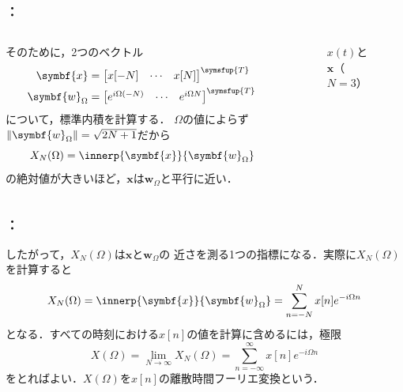 \documentclass[unicode,11pt]{beamer}
\newcommand{\figurewidth}{5cm}
\newcommand{\termdef}[1]{\alert{\sffamily #1}}
\newcommand{\trps}[1]{#1^{\symsfup{T}}}
\newcommand{\vb}[1]{\symbf{#1}}
\DeclarePairedDelimiter{\norm}{\lVert}{\rVert}
\begin{document}
\begin{frame}
  \frametitle{\secname ：\subsecname}
  \begin{columns}
    \begin{column}{0.6\textwidth}
      そのために，2つのベクトル
      \begin{align*}
        \vb{x} &= \trps{\begin{bmatrix}x[-N] & \cdots & x[N]\end{bmatrix}} \\
        \vb{w}_\Omega &= \trps{\begin{bmatrix}e^{i\Omega(-N)} & \cdots & e^{i\Omega N}\end{bmatrix}}
      \end{align*}
      について，標準内積を計算する．
      \(\Omega\)の値によらず\(\norm{\vb{w}_\Omega}=\sqrt{2N+1}\)だから
      \[
        X_N(\Omega) = \innerp{\vb{x}}{\vb{w}_\Omega}
      \]
      の絶対値が大きいほど，\(\vb{x}\)は\(\vb{w}_\Omega\)と平行に近い．
    \end{column}
    \begin{column}{0.4\textwidth}
      \begin{figure}
        \centering
        \caption{\(x(t)\)と\(\vb{x}\)（\(N=3\)）}
      \end{figure}
    \end{column}
  \end{columns}
\end{frame}

\begin{frame}
  \frametitle{\secname ：\subsecname}
  したがって，\(X_N(\Omega)\)は\(\vb{x}\)と\(\vb{w}_\Omega\)の
  近さを測る1つの指標になる．実際に\(X_N(\Omega)\)を計算すると
  \[
    X_N(\Omega) = \innerp{\vb{x}}{\vb{w}_\Omega}
    = \sum_{n=-N}^Nx[n]e^{-i\Omega n}
  \]
  となる．すべての時刻における\(x[n]\)の値を計算に含めるには，極限
  \[
    X(\Omega) = \lim_{N\to\infty}X_N(\Omega) = \sum_{n=-\infty}^\infty x[n]e^{-i\Omega n}
  \]
  をとればよい．\(X(\Omega)\)を\(x[n]\)の\termdef{離散時間フーリエ変換}という．
\end{frame}
\end{document}
